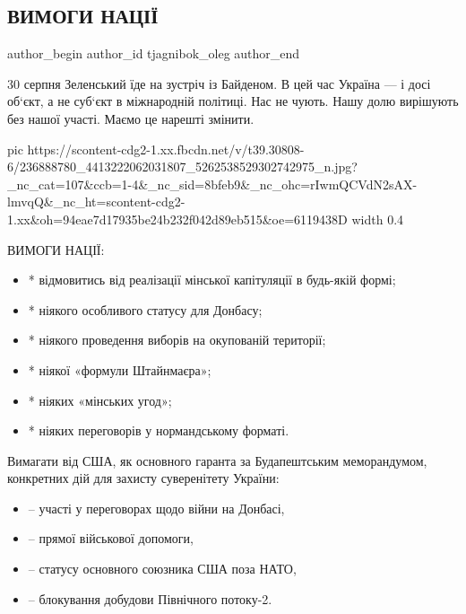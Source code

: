  
 
 
 
 
 
\subsection{ВИМОГИ НАЦІЇ}
\label{sec:11_08_2021.fb.tjagnibok_oleg.1.vymogy_nacii}
 
\ifcmt
 author_begin
   author_id tjagnibok_oleg
 author_end
\fi

30 серпня Зеленський їде на зустріч із Байденом. В цей час Україна — і досі
об‘єкт, а не суб‘єкт в міжнародній політиці. Нас не чують. Нашу долю вирішують
без нашої участі. Маємо це нарешті змінити. 

\ifcmt
  pic https://scontent-cdg2-1.xx.fbcdn.net/v/t39.30808-6/236888780_4413222062031807_5262538529302742975_n.jpg?_nc_cat=107&ccb=1-4&_nc_sid=8bfeb9&_nc_ohc=rIwmQCVdN2sAX-lmvqQ&_nc_ht=scontent-cdg2-1.xx&oh=94eae7d17935be24b232f042d89eb515&oe=6119438D
  width 0.4
\fi

ВИМОГИ НАЦІЇ:

\begin{itemize}
  \item * відмовитись від реалізації мінської капітуляції в будь-якій формі;
  \item * ніякого особливого статусу для Донбасу;
  \item * ніякого проведення виборів на окупованій території;
  \item * ніякої «формули Штайнмаєра»;
  \item * ніяких «мінських угод»;
  \item * ніяких переговорів у нормандському форматі.
\end{itemize}

Вимагати від США, як основного гаранта за Будапештським меморандумом,
конкретних дій для захисту суверенітету України:

\begin{itemize}
  \item – участі у переговорах щодо війни на Донбасі,
  \item – прямої військової допомоги,
  \item – статусу основного союзника США поза НАТО, 
  \item – блокування добудови Північного потоку-2.
\end{itemize}

